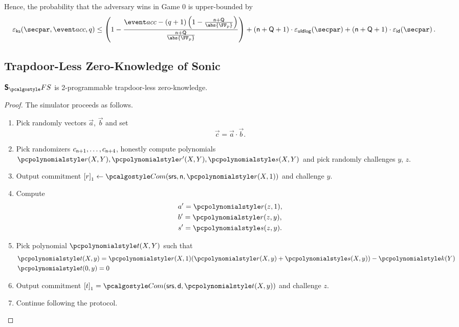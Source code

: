   Hence, the probability that the adversary wins in Game 0 is upper-bounded by 
  \[
    \epscss(\secpar,\accProb, q) \leq \left(1 - \frac{\accProb - (q + 1) \left( 1 - \frac{\multconstr + \linconstr}{\abs{\FF_p}} \right)}{\frac{\multconstr + \linconstr}{\abs{\FF_p}}}\right) + (\multconstr + \linconstr + 1) \cdot\epsuldlog (\secpar) + (\multconstr + \linconstr + 1) \cdot \epsid (\secpar)\,. 
  \]

\subsection{Trapdoor-Less Zero-Knowledge of Sonic}
\begin{lemma}
\label{lem:sonic_hvzk}
$\sonicprotfs$ is 2-programmable trapdoor-less zero-knowledge.
\end{lemma}
\begin{proof}
  The simulator proceeds as follows.
  \begin{enumerate}
  \item Pick randomly vectors $\vec{a}$, $\vec{b}$ and set
    \begin{equation}
      \label{eq:ab_eq_c}
      \vec{c} = \vec{a} \cdot \vec{b}. 
    \end{equation}
  \item Pick randomizers $c_{\mathsf{n} + 1}, \ldots, c_{\mathsf{n} + 4}$,
    honestly compute polynomials $\p{r}(X, Y), \p{r'}(X, Y), \p{s}(X, Y)$ and
    pick randomly challenges $y$, $z$.
  \item Output commitment $\gone{r} \gets \com(\srs, \multconstr, \p{r} (X,
    1))$ and challenge $y$. 
  \item Compute
    \begin{align*}
      & a' = \p{r}(z, 1),\\
      & b' = \p{r}(z, y),\\
      & s' = \p{s}(z, y).
    \end{align*} 
  \item Pick polynomial $\p{t}(X, Y)$ such that
    \begin{align*}
      & \p{t} (X, y) = \p{r} (X, 1) (\p{r}(X, y) + \p{s} (X, y)) - \p{k} (Y)\\
      & \p{t} (0, y) = 0
    \end{align*}
  \item Output commitment $\gone{t} = \com (\srs, \dconst, \p{t} (X, y))$ and
    challenge $z$.
  \item Continue following the protocol.
  \end{enumerate}


\end{proof}
